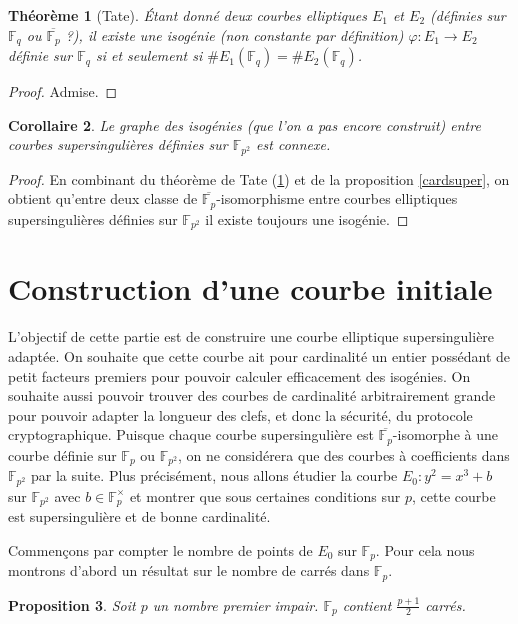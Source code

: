 \documentclass{article}
\theoremstyle{plain}%
\newtheorem{thm}{Théorème}[section]
\newtheorem{prop}[thm]{Proposition}
\newtheorem{cor}[thm]{Corollaire}
\theoremstyle{definition}%
\newcommand{\F}{\mathbb{F}}
\begin{document}
\begin{thm}[Tate]
  \label{tate}
  Étant donné deux courbes elliptiques $E_1$ et $E_2$ (définies sur $\F_{q}$ ou $\overline{\F_p}$ ?), il existe une isogénie (non constante par définition) $\varphi : E_1 \to E_2$ définie sur $\F_q$ si et seulement si $\# E_1(\F_q) = \# E_2(\F_q)$. \end{thm}

\begin{proof}
  Admise.
\end{proof}

\begin{cor}
  Le graphe des isogénies (que l'on a pas encore construit) entre courbes supersingulières définies sur $\F_{p^2}$ est connexe.
\end{cor}

\begin{proof}
  En combinant du théorème de Tate (\ref{tate}) et de la proposition \ref{cardsuper}, on obtient qu'entre deux classe de $\overline{\F_p}$-isomorphisme entre courbes elliptiques supersingulières définies sur $\F_{p^2}$ il existe toujours une isogénie.
\end{proof}

\section{Construction d'une courbe initiale}

L'objectif de cette partie est de construire une courbe elliptique supersingulière adaptée. 
On souhaite que cette courbe ait pour cardinalité un entier possédant de petit facteurs premiers pour pouvoir calculer efficacement des isogénies. 
On souhaite aussi pouvoir trouver des courbes de cardinalité arbitrairement grande pour pouvoir adapter la longueur des clefs, et donc la sécurité, du protocole cryptographique.
Puisque chaque courbe supersingulière est $\overline{\F_p}$-isomorphe à une courbe définie sur $\F_{p}$ ou $\F_{p^2}$, on ne considérera que des courbes à coefficients dans $\F_{p^2}$ par la suite.
Plus précisément, nous allons étudier la courbe $E_0 : y^2 = x^3 + b$ sur $\F_{p^2}$ avec $b\in\F_{p}^\times$ et montrer que sous certaines conditions sur $p$, cette courbe est supersingulière et de bonne cardinalité.


Commençons par compter le nombre de points de $E_0$ sur $\F_{p}$. Pour cela nous montrons d'abord un résultat sur le nombre de carrés dans $\F_{p}$.

\begin{prop}
  Soit $p$ un nombre premier impair. $\F_{p}$ contient $\frac{p+1}{2}$ carrés.
\end{prop}
\end{document}
